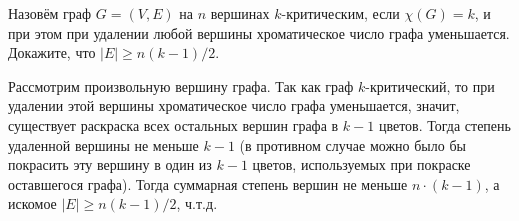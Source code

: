 \begin{task}{58}
Назовём граф $G = (V, E)$ на $n$ вершинах $k$-критическим, если $\chi(G) = k$, и при этом при удалении любой вершины хроматическое число графа уменьшается. Докажите, что $|E|\geq n(k-1)/2$.
\end{task}
\begin{solution}
Рассмотрим произвольную вершину графа. Так как граф $k$-критический, то при удалении этой вершины хроматическое число графа уменьшается, значит, существует раскраска всех остальных вершин графа в $k - 1$ цветов. Тогда степень удаленной вершины не меньше $k-1$ (в противном случае можно было бы покрасить эту вершину в один из $k-1$ цветов, используемых при покраске оставшегося графа). Тогда суммарная степень вершин не меньше $n\cdot(k-1)$, а искомое $|E|\geq n(k-1)/2$, ч.т.д.
\end{solution}
